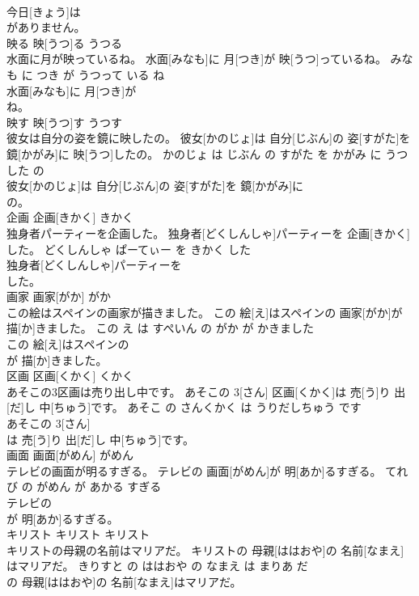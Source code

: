 \documentclass[8pt]{extreport}
\begin{document}
\begin{CJK}{UTF8}{min}
\\	今日[きょう]は
\\	がありません。			
\\	映る	映[うつ]る	うつる	
\\	水面に月が映っているね。	水面[みなも]に 月[つき]が 映[うつ]っているね。	みなも に つき が うつって いる ね	
\\	水面[みなも]に 月[つき]が
\\	ね。			
\\	映す	映[うつ]す	うつす	
\\	彼女は自分の姿を鏡に映したの。	彼女[かのじょ]は 自分[じぶん]の 姿[すがた]を 鏡[かがみ]に 映[うつ]したの。	かのじょ は じぶん の すがた を かがみ に うつした の	
\\	彼女[かのじょ]は 自分[じぶん]の 姿[すがた]を 鏡[かがみ]に
\\	の。			
\\	企画	企画[きかく]	きかく	
\\	独身者パーティーを企画した。	独身者[どくしんしゃ]パーティーを 企画[きかく]した。	どくしんしゃ ぱーてぃー を きかく した	
\\	独身者[どくしんしゃ]パーティーを
\\	した。			
\\	画家	画家[がか]	がか	
\\	この絵はスペインの画家が描きました。	この 絵[え]はスペインの 画家[がか]が 描[か]きました。	この え は すぺいん の がか が かきました	
\\	この 絵[え]はスペインの
\\	が 描[か]きました。			
\\	区画	区画[くかく]	くかく	
\\	あそこの3区画は売り出し中です。	あそこの 3[さん] 区画[くかく]は 売[う]り 出[だ]し 中[ちゅう]です。	あそこ の さんくかく は うりだしちゅう です	
\\	あそこの 3[さん]
\\	は 売[う]り 出[だ]し 中[ちゅう]です。			
\\	画面	画面[がめん]	がめん	
\\	テレビの画面が明るすぎる。	テレビの 画面[がめん]が 明[あか]るすぎる。	てれび の がめん が あかる すぎる	
\\	テレビの
\\	が 明[あか]るすぎる。			
\\	キリスト	キリスト	キリスト	
\\	キリストの母親の名前はマリアだ。	キリストの 母親[ははおや]の 名前[なまえ]はマリアだ。	きりすと の ははおや の なまえ は まりあ だ	
\\	の 母親[ははおや]の 名前[なまえ]はマリアだ。			

\end{CJK}
\end{document}
